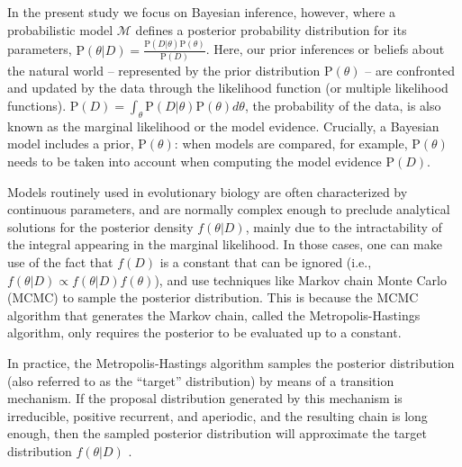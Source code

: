 \documentclass[oneside]{article}
\providecommand{\DIFaddtex}[1]{{\protect\color{blue}\uwave{#1}}} %
\providecommand{\DIFdeltex}[1]{{\protect\color{red}\sout{#1}}}                      %
\providecommand{\DIFaddbegin}{} %
\providecommand{\DIFaddend}{} %
\providecommand{\DIFdelbegin}{} %
\providecommand{\DIFdelend}{} %
\providecommand{\DIFadd}[1]{\texorpdfstring{\DIFaddtex{#1}}{#1}} %
\providecommand{\DIFdel}[1]{\texorpdfstring{\DIFdeltex{#1}}{}} %
\newcommand{\DIFscaledelfig}{0.5}
\newlength{\DIFdelgraphicswidth} %
\newlength{\DIFdelgraphicsheight} %
\newcommand{\DIFaddincludegraphics}[2][]{{\color{blue}\fbox{\DIFOincludegraphics[#1]{#2}}}} %
\newcommand{\DIFdelincludegraphics}[2][]{%
\sbox{\DIFdelgraphicsbox}{\DIFOincludegraphics[#1]{#2}}%
\settoboxwidth{\DIFdelgraphicswidth}{\DIFdelgraphicsbox} %
\settoboxtotalheight{\DIFdelgraphicsheight}{\DIFdelgraphicsbox} %
\scalebox{\DIFscaledelfig}{%
\parbox[b]{\DIFdelgraphicswidth}{\usebox{\DIFdelgraphicsbox}\\[-\baselineskip] \rule{\DIFdelgraphicswidth}{0em}}\llap{\resizebox{\DIFdelgraphicswidth}{\DIFdelgraphicsheight}{%
\setlength{\unitlength}{\DIFdelgraphicswidth}%
\begin{picture}(1,1)%
\thicklines\linethickness{2pt} %
{\color[rgb]{1,0,0}\put(0,0){\framebox(1,1){}}}%
{\color[rgb]{1,0,0}\put(0,0){\line( 1,1){1}}}%
{\color[rgb]{1,0,0}\put(0,1){\line(1,-1){1}}}%
\end{picture}%
}\hspace*{3pt}}} %
} %
\DeclareRobustCommand{\DIFaddbegin}{\DIFOaddbegin \let\includegraphics\DIFaddincludegraphics} %
\DeclareRobustCommand{\DIFaddend}{\DIFOaddend \let\includegraphics\DIFOincludegraphics} %
\DeclareRobustCommand{\DIFdelbegin}{\DIFOdelbegin \let\includegraphics\DIFdelincludegraphics} %
\DeclareRobustCommand{\DIFdelend}{\DIFOaddend \let\includegraphics\DIFOincludegraphics} %
\begin{document}
In the present study we focus on Bayesian inference, however, 
where a probabilistic model $\mathcal{M}$ defines a posterior probability
distribution for its parameters, \DIFdelbegin \DIFdel{$\text{P}(\theta|D) =
\frac{\text{P}(D|\theta)\text{P}(\theta)}{\text{P}(D)}$}\DIFdelend \DIFaddbegin \DIFadd{$f(\theta|d) =
\frac{f(d|\theta)f(\theta)}{f(d)}$}\DIFaddend .
Here, our prior inferences or beliefs about the natural world -- represented by
the prior distribution \DIFdelbegin \DIFdel{$\text{P}(\theta)$ }\DIFdelend \DIFaddbegin \DIFadd{$f(\theta)$ }\DIFaddend -- are confronted and updated by
the data through the likelihood function (or multiple likelihood functions).
\DIFdelbegin \DIFdel{$\text{P}(D) = \int_\theta \text{P}(D|\theta)\text{P}(\theta)d\theta$}\DIFdelend \DIFaddbegin \DIFadd{$f(d) = \int_\Theta f(d|\theta)f(\theta)d\theta$}\DIFaddend , the
probability of the data, is also known as the marginal likelihood or the model
evidence.
Crucially, a Bayesian model includes a prior, \DIFdelbegin \DIFdel{$\text{P}(\theta)$}\DIFdelend \DIFaddbegin \DIFadd{$f(\theta)$}\DIFaddend :
when models are compared, for example, \DIFdelbegin \DIFdel{$\text{P}(\theta)$ }\DIFdelend \DIFaddbegin \DIFadd{$f(\theta)$ }\DIFaddend needs to be taken
into account when computing the model evidence \DIFdelbegin \DIFdel{$\text{P}(D)$}\DIFdelend \DIFaddbegin \DIFadd{$f(d)$}\DIFaddend .

Models routinely used in evolutionary biology are often characterized by
continuous parameters, and are normally complex enough to preclude
analytical solutions for the posterior density \DIFdelbegin \DIFdel{$f(\theta|D)$}\DIFdelend \DIFaddbegin \DIFadd{$f(\theta|d)$}\DIFaddend , mainly
due to the intractability of the integral appearing in the marginal
likelihood.
In those cases, one can make use of the fact that \DIFdelbegin \DIFdel{$f(D)$
}\DIFdelend \DIFaddbegin \DIFadd{$f(d)$
}\DIFaddend is a constant that can be ignored (i.e., \DIFdelbegin \DIFdel{$f(\theta|D)
\propto f(\theta|D)f(\theta)$}\DIFdelend \DIFaddbegin \DIFadd{$f(\theta|d)
\propto f(\theta|d)f(\theta)$}\DIFaddend ), and use 
techniques like Markov chain Monte Carlo (MCMC) to sample the posterior
distribution.
This is because the MCMC algorithm that generates the Markov chain,
called the Metropolis-Hastings \citep{metropolis53,mh} algorithm, only requires the
posterior to be evaluated up to a constant.

In practice, the Metropolis-Hastings algorithm samples the posterior
distribution (also referred to as the ``target'' distribution) by means of a
transition mechanism. 
If the proposal distribution generated by this mechanism is
irreducible, positive recurrent, and aperiodic, and the resulting
chain is long enough, then the sampled posterior distribution will approximate
the target distribution \DIFdelbegin \DIFdel{$f(\theta|D)$ }\DIFdelend \DIFaddbegin \DIFadd{$f(\theta|d)$ }\DIFaddend \citep{smith93,tierney94,gelman}.
\end{document}
